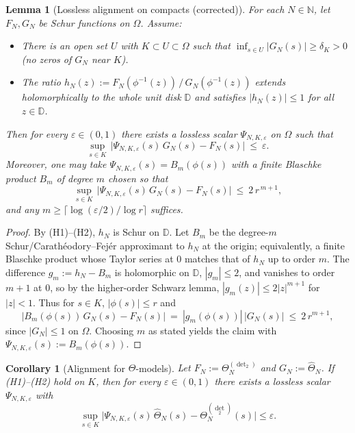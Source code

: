 \documentclass[11pt]{article}
\newtheorem{lemma}[theorem]{Lemma}
\newtheorem{corollary}[theorem]{Corollary}
\theoremstyle{definition}
\theoremstyle{remark}
\newcommand{\N}{\mathbb{N}}
\begin{document}
\begin{lemma}[Lossless alignment on compacts (corrected)]\label{lem:alignment-corrected}
For each \(N\in\N\), let \(F_N,G_N\) be Schur functions on \(\Omega\). Assume:
\begin{itemize}
  \item[(H1)] There is an open set \(U\) with \(K\subset U\subset\Omega\) such that \(\inf_{s\in U}|G_N(s)|\ge \delta_K>0\) (no zeros of \(G_N\) near \(K\)).
  \item[(H2)] The ratio \(h_N(z):=F_N(\phi^{-1}(z))\,/\,G_N(\phi^{-1}(z))\) extends holomorphically to the whole unit disk \(\mathbb D\) and satisfies \(|h_N(z)|\le 1\) for all \(z\in\mathbb D\).
\end{itemize}
Then for every \(\varepsilon\in(0,1)\) there exists a lossless scalar \(\Psi_{N,K,\varepsilon}\) on \(\Omega\) such that
\[
  \sup_{s\in K}\,\bigl|\Psi_{N,K,\varepsilon}(s)\,G_N(s)-F_N(s)\bigr|\ \le\ \varepsilon.
\]
Moreover, one may take \(\Psi_{N,K,\varepsilon}(s)=B_m(\phi(s))\) with a finite Blaschke product \(B_m\) of degree \(m\) chosen so that
\[
  \sup_{s\in K}\,\bigl|\Psi_{N,K,\varepsilon}(s)\,G_N(s)-F_N(s)\bigr|\ \le\ 2\,r^{\,m+1},
\]
and any \(m\ge \bigl\lceil {\log(\varepsilon/2)}/{\log r}\bigr\rceil\) suffices.
\end{lemma}
\begin{proof}
By (H1)–(H2), \(h_N\) is Schur on \(\mathbb D\). Let \(B_m\) be the degree-\(m\) Schur/Carath\'eodory–Fej\'er approximant to \(h_N\) at the origin; equivalently, a finite Blaschke product whose Taylor series at 0 matches that of \(h_N\) up to order \(m\). The difference \(g_m:=h_N-B_m\) is holomorphic on \(\mathbb D\), \(|g_m|\le 2\), and vanishes to order \(m{+}1\) at 0, so by the higher-order Schwarz lemma, \(|g_m(z)|\le 2|z|^{m+1}\) for \(|z|<1\). Thus for \(s\in K\), \(|\phi(s)|\le r\) and
\[
  \bigl|B_m(\phi(s))\,G_N(s)-F_N(s)\bigr|\ =\ |g_m(\phi(s))|\,|G_N(s)|\ \le\ 2\,r^{m+1},
\]
since \(|G_N|\le 1\) on \(\Omega\). Choosing \(m\) as stated yields the claim with \(\Psi_{N,K,\varepsilon}(s):=B_m(\phi(s))\).
\end{proof}

\begin{corollary}[Alignment for \(\Theta\)-models]\label{cor:ThetaAlignment-corrected}
Let \(F_N:=\Theta^{(\operatorname{det}_2)}_N\) and \(G_N:=\widehat{\Theta}_N\). If \emph{(H1)}–\emph{(H2)} hold on \(K\), then for every \(\varepsilon\in(0,1)\) there exists a lossless scalar \(\Psi_{N,K,\varepsilon}\) with
\[
  \sup_{s\in K} \bigl| \Psi_{N,K,\varepsilon}(s)\,\widehat{\Theta}_N(s)-\Theta^{(\operatorname{det}_2)}_N(s) \bigr| \le \varepsilon.
\]
\end{corollary}
\end{document}
